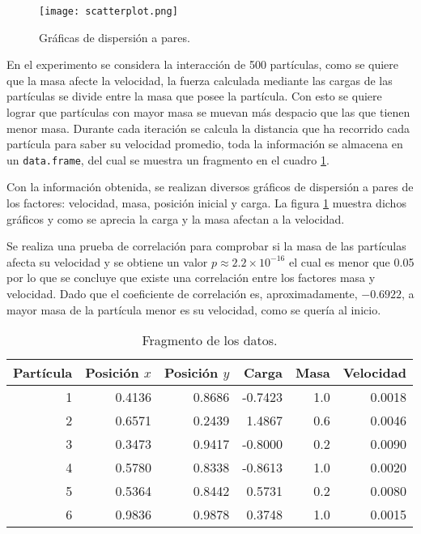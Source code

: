 \documentclass[12pt,letterpaper]{article}
\begin{document}
\begin{figure}
\centering
\texttt{[image: scatterplot.png]} 		
 		\caption{Gráficas de dispersión a pares.}
 		\label{4}
\end{figure}

En el experimento se considera la interacción de 500 partículas, como se quiere que la masa afecte la velocidad, la fuerza calculada mediante las cargas de las partículas se divide entre la masa que posee la partícula. Con esto se quiere lograr que partículas con mayor masa se muevan más despacio que las que tienen menor masa. Durante cada iteración se calcula la distancia que ha recorrido cada partícula para saber su velocidad promedio, toda la información se almacena en un \texttt{data.frame}, del cual se muestra un fragmento en el cuadro \ref{data}.

Con la información obtenida, se realizan diversos gráficos de dispersión a pares de los factores: velocidad, masa, posición inicial y carga. La figura \ref{4} muestra dichos gráficos y como se aprecia la carga y la masa afectan a la velocidad.

Se realiza una prueba de correlación para comprobar si la masa de las partículas afecta su velocidad y se obtiene un valor $p \approx 2.2\times 10^{-16}$ el cual es menor que 0.05 por lo que se concluye que existe una correlación entre los factores masa y velocidad. Dado que el coeficiente de correlación es, aproximadamente, $-0.6922$, a mayor masa de la partícula menor es su velocidad, como se quería al inicio.
\begin{table}
\centering
\caption{Fragmento de los datos.}
\begin{tabular}{rrrrrr}
  \hline
Partícula & Posición $x$ & Posición $y$ & Carga & Masa &Velocidad\\ 
  \hline
1 & 0.4136 & 0.8686 & -0.7423 & 1.0 & 0.0018 \\ 
2 & 0.6571 & 0.2439 & 1.4867 & 0.6 & 0.0046 \\ 
3 & 0.3473 & 0.9417 & -0.8000 & 0.2 & 0.0090\\ 
4 & 0.5780 & 0.8338 & -0.8613 & 1.0 & 0.0020 \\
5 & 0.5364 & 0.8442 & 0.5731 & 0.2 & 0.0080 \\
6 & 0.9836 & 0.9878 & 0.3748 & 1.0 & 0.0015\\
\hline
\end{tabular}
\label{data}
\end{table}
 

\end{document}

